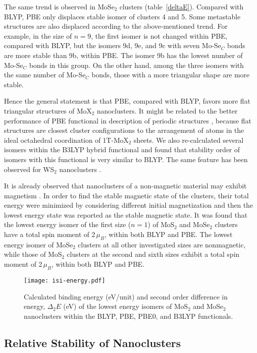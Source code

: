 \documentclass[nofootinbib,10pt,aip,twocolumn,showpacs]{revtex4-1}
\begin{document}
The same trend is observed in MoSe$_2$ clusters (table~\ref{deltaE}). 
Compared with BLYP, PBE only displaces stable isomer of clusters 4 and 5.
Some metastable structures are also displaced according to 
the above-mentioned trend. 
For example, in the size of $n=9$, the first isomer is not changed within PBE,
compared with BLYP, but the isomers 9d, 9e, and 9c with seven Mo-Se$_{C}$ bonds 
are more stable than 9b, within PBE.
The isomer 9b has the lowest number of Mo-Se$_C$ bonds in this group.
On the other hand, among the three isomers with the same number of Mo-Se$_{C}$ bonds,
those with a more triangular shape are more stable.

Hence the general statement is that PBE, compared with BLYP, 
favors more flat triangular structures of MoX$_2$ nanoclusters.
It might be related to the better performance of PBE functional 
in description of periodic structures \cite{martin2004}, 
because flat structures are closest cluster
configurations to the arrangement of atoms in the ideal
octahedral coordination of 1T-MoX$_2$ sheets.
We also re-calculated several isomers within the B3LYP hybrid functional 
and found that stability order of isomers with this functional
is very similar to BLYP.
The same feature has been observed for WS$_2$ nanoclusters \cite{hafizi2016}.

It is already observed that nanoclusters of a non-magnetic material 
may exhibit magnetism \cite{hafizi2016,murugan2005a}.
In order to find the stable magnetic state of the clusters,
their total energy were minimized by considering different initial magnetization
and then the lowest energy state was reported as the stable magnetic state.
It was found that the lowest energy isomer of the first size ($n=1$) 
of MoS$_2$ and MoSe$_2$ clusters have a total spin moment of 2\,$\mu_B$, 
within both BLYP and PBE.
The lowest energy isomer of MoSe$_2$ clusters at all other investigated sizes
are nonmagnetic, while those of MoS$_2$ clusters at the second and sixth sizes
exhibit a total spin moment of 2\,$\mu_B$, within both BLYP and PBE.


\begin{figure*}
\texttt{[image: isi-energy.pdf]}
\caption{\label{energy}
 Calculated binding energy (eV/unit) and second order difference in energy,
 $\Delta_2E$ (eV) of the lowest energy isomers of MoS$_2$ and  MoSe$_2$ 
 nanoclusters within the BLYP, PBE, PBE0, and B3LYP functionals.}
\end{figure*}


\subsection{Relative Stability of Nanoclusters}  
\end{document}
